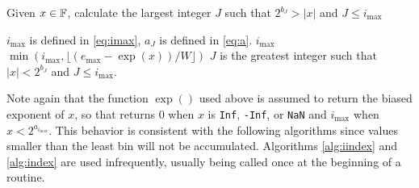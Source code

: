     \begin{samepage}
    \begin{alg}
      Given $x \in \mathbb{F}$, calculate the largest integer $J$ such that $2^{b_J} > |x|$ and $J \leq i_{\max}$
      \begin{algorithmic}[1]
        \Require $i_{\max}$ is defined in \eqref{eq:imax},
          $a_J$ is defined in \eqref{eq:a}.
           \State \Return $i_{\max}$ \EndIf
          \State \Return $\min(i_{\max}, \lfloor(e_{\max} - \exp(x))/W\rfloor)$
        \EndFunction
        \Ensure
          \Statex $J$ is the greatest integer such that $|x| < 2^{b_J}$ and $J \leq i_{\max}$.
      \end{algorithmic}
      \label{alg:index}
    \end{alg}
     \end{samepage}

    Note again that the function $\exp()$ used above is assumed to return the biased exponent of $x$, so that  returns 0 when $x$ is \texttt{Inf}, \texttt{-Inf}, or \texttt{NaN} and $i_{\max}$ when $x < 2^{a_{i_{\max}}}$.
    This behavior is consistent with the following algorithms since values smaller than the least bin will not be accumulated. Algorithms \ref{alg:iindex} and \ref{alg:index} are used infrequently, usually being called once at the beginning of a routine.
